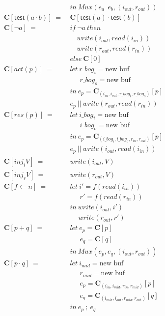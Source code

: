 \documentclass[12pt, letterpaper]{article}
\begin{document}
{\begin{align*}
      &in\ Mux(e_a\ \ e_b, (i_{out},r_{out}))\\
    \mathbf{C}[\mathsf{test}(a \cdot b)]\ 
       =\ &\mathbf{C}[\mathsf{test}(a) \cdot \mathsf{test}(b)] \\
    \mathbf{C}[\neg a]\ 
       =\ 
       &if\ \neg a\ then\\
       &\quad write(i_{out}, read(i_{in}))\\
       &\quad write(r_{out}, read(r_{in}))\\
       &else\ \mathbf{C}[0]\\
    \mathbf{C}[act(p)]\ 
      =\ &
      let\ r\_bog_i = \text{new buf}\\
      &\quad\ \ r\_bog_o = \text{new buf}\\
      &in\ e_p = \mathbf{C}_{(i_{in}, i_{out}, r\_bog_i, r\_bog_o)}[p]\\
      &e_p\ ||\ write(r_{out}, read(r_{in}))
      \\
    \mathbf{C}[res(p)]\ 
      =\ &
      let\ i\_bog_i = \text{new buf}\\
      &\quad\ \ i\_bog_o = \text{new buf}\\
      &in\ e_p = \mathbf{C}_{(i\_bog_i, i\_bog_o, r_{in}, r_{out})}[p]\\
      &e_p\ ||\ write(i_{out}, read(i_{in}))
      \\
    \mathbf{C}[inj_iV]\ 
      =\ &
      write(i_{out}, V)
      \\
    \mathbf{C}[inj_rV]\ 
      =\ &
      write(r_{out}, V)
      \\
    \mathbf{C}[f \leftarrow n]\ 
      =\ &
      let\ i' = f(read(i_{in}))\\
      &\quad\ \ r' = f(read(r_{in}))\\
      &in\ write(i_{out}, i')\\
      &\quad \ write(r_{out}, r')
      \\
    \mathbf{C}[p + q]\ 
      =\ &
      let\ e_p = \mathbf{C}[p]\\
      &\quad\ \ e_q = \mathbf{C}[q]\\
      &in\ Mux(e_p, e_q, (i_{out},r_{out}))
      \\
    \mathbf{C}[p \cdot q]\ 
      =\ &
      let\ i_{mid} = \text{new buf}\\
      &\quad\ \ r_{mid} = \text{new buf}\\
      &\quad\ \ e_p = \mathbf{C}_{(i_{in}, i_{mid}, r_{in}, r_{mid})}[p]\\
      &\quad\ \ e_q = \mathbf{C}_{(i_{mid}, i_{out}, r_{mid}, r_{out})}[q]\\
      &in\ e_p\ ;\ e_q
  \end{align*}
  }
\end{document}
